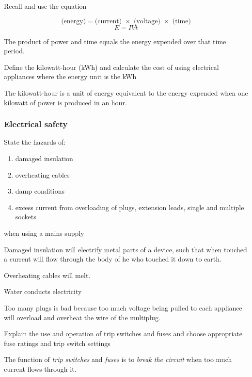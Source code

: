 \begin{subpoint}
Recall and use the equation

$$ \textrm{(energy)} = \textrm{(current) $\times$ (voltage) $\times$ (time)} $$
$$ E = IVt $$
\end{subpoint}

The product of power and time equals the energy expended over that time period.

\begin{subpoint}
Define the kilowatt-hour (kWh) and calculate the cost of using electrical appliances where the energy unit 
is the kWh
\end{subpoint}

The kilowatt-hour is a unit of energy equivalent to the energy expended when one kilowatt of power
is produced in an hour.

\subsubsection{Electrical safety}
\begin{subpoint}
State the hazards of:
\begin{enumerate}[label=(\alph*)]
	\setlength\itemsep{0em}
	\item damaged insulation
	\item overheating cables
	\item damp conditions
	\item excess current from overloading of plugs, extension leads, single and multiple sockets
\end{enumerate}
when using a mains supply
\end{subpoint}

Damaged insulation will electrify metal parts of a device, such that when touched a current will
flow through the body of he who touched it down to earth.

Overheating cables will melt.

Water conducts electricity

Too many plugs is bad because too much voltage being pulled to each appliance will overload
and overheat the wire of the multiplug.

\begin{subpoint}
Explain the use and operation of trip switches and fuses and choose appropriate fuse ratings and trip switch 
settings
\end{subpoint}

The function of \emph{trip switches} and \emph{fuses} is to \emph{break the circuit}
when too much current flows through it. 

